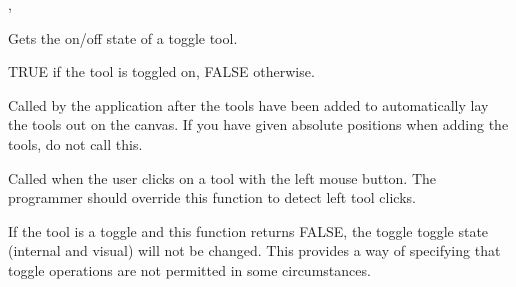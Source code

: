


,\rtfsp
{}\rtfsp

\label{wxtoolbarbasegettoolstate}


Gets the on/off state of a toggle tool.




TRUE if the tool is toggled on, FALSE otherwise.

%
%
\label{wxtoolbarbaselayout}


Called by the application after the tools have been added to
automatically lay the tools out on the canvas. If you have given
absolute positions when adding the tools, do not call this.

\label{wxtoolbarbaseonleftclick}


Called when the user clicks on a tool with the left mouse button. The
programmer should override this function to detect left tool clicks.





If the tool is a toggle and this function returns FALSE, the toggle
toggle state (internal and visual) will not be changed. This provides a way of
specifying that toggle operations are not permitted in some circumstances.


